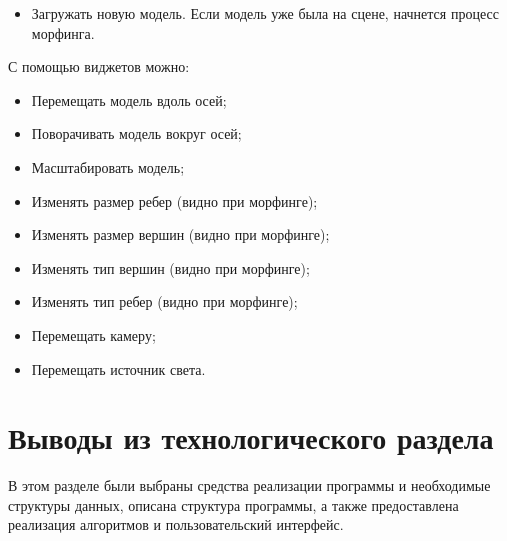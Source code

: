 \begin{itemize}
	\item Загружать новую модель. 
	Если модель уже была на сцене, начнется процесс морфинга.
\end{itemize}

	
С помощью виджетов можно:
\begin{itemize}
	\item Перемещать модель вдоль осей;
	\item Поворачивать модель вокруг осей;
	\item Масштабировать модель;
	\item Изменять размер ребер (видно при морфинге);
	\item Изменять размер вершин (видно при морфинге);
	\item Изменять тип вершин (видно при морфинге);
	\item Изменять тип ребер (видно при морфинге);
	\item Перемещать камеру;
	\item Перемещать источник света.
\end{itemize}


\section*{Выводы из технологического раздела}

В этом разделе были выбраны средства реализации программы и необходимые структуры данных, описана структура программы, а также предоставлена реализация алгоритмов и пользовательский интерфейс.
